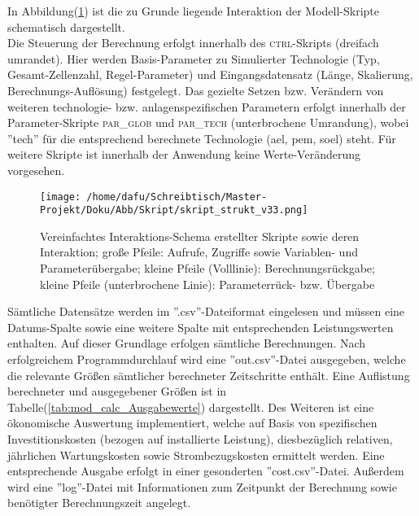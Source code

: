 \documentclass[onecolumn,10pt,titlepage]{article}
\begin{document}
In Abbildung(\ref{fig:Strukt_Skript}) ist die zu Grunde liegende Interaktion der Modell-Skripte schematisch dargestellt.\\
Die Steuerung der Berechnung erfolgt innerhalb des \textsc{ctrl}-Skripts (dreifach umrandet). Hier werden Basis-Parameter zu Simulierter Technologie (Typ, Gesamt-Zellenzahl, Regel-Parameter) und Eingangsdatensatz (Länge, Skalierung, Berechnungs-Auflösung) festgelegt.
 Das gezielte Setzen bzw. Verändern von weiteren technologie- bzw. anlagenspezifischen Parametern erfolgt innerhalb der Parameter-Skripte \textsc{par\_glob} und \textsc{par\_tech} (unterbrochene Umrandung), wobei ''tech'' für die entsprechend berechnete Technologie (\gls{ael}, \gls{pem}, \gls{soel}) steht. Für weitere Skripte ist innerhalb der Anwendung keine Werte-Veränderung vorgesehen.\\
\begin{figure}[H]
	
	\centering
	\texttt{[image: /home/dafu/Schreibtisch/Master-Projekt/Doku/Abb/Skript/skript\_strukt\_v33.png]}
	\caption[Skript-Interaktions-Schema]{Vereinfachtes Interaktions-Schema erstellter Skripte sowie deren Interaktion; große Pfeile: Aufrufe, Zugriffe sowie Variablen- und Parameterübergabe; kleine Pfeile (Volllinie): Berechnungsrückgabe; kleine Pfeile (unterbrochene Linie): Parameterrück- bzw. Übergabe}
	\label{fig:Strukt_Skript} 
\end{figure}

Sämtliche Datensätze werden im ''.csv''-Dateiformat eingelesen und müssen eine Datums-Spalte sowie eine weitere Spalte mit entsprechenden Leistungswerten enthalten. Auf dieser Grundlage erfolgen sämtliche Berechnungen. Nach erfolgreichem Programmdurchlauf wird eine ''out.csv''-Datei ausgegeben, welche die relevante Größen sämtlicher berechneter Zeitschritte enthält. Eine Auflistung berechneter und ausgegebener Größen ist in Tabelle(\ref{tab:mod_calc_Ausgabewerte}) dargestellt. Des Weiteren ist eine ökonomische Auswertung implementiert, welche auf Basis von spezifischen Investitionskosten (bezogen auf installierte Leistung), diesbezüglich relativen, jährlichen Wartungskosten sowie Strombezugskosten ermittelt werden. Eine entsprechende Ausgabe erfolgt in einer gesonderten ''cost.csv''-Datei. Außerdem wird eine ''log''-Datei mit Informationen zum Zeitpunkt der Berechnung sowie benötigter Berechnungszeit angelegt. 
\end{document}
